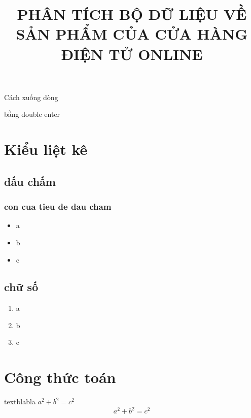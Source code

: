 \documentclass[twoside, final]{hcmut_report}
\title{PHÂN TÍCH BỘ DỮ LIỆU VỀ SẢN PHẨM CỦA CỬA HÀNG ĐIỆN TỬ ONLINE}
\begin{document}
\begin{titlepage}
    \coverpage
\end{titlepage}
\newpage
\setcounter{page}{1}
\pagestyle{empty}
\tableofcontents
\pagestyle{fancy}
\pagebreak
Cách xuống dòng

bằng double enter
\section{Kiểu liệt kê}
\subsection{dấu chấm}
\subsubsection{con cua tieu de dau cham}

\begin{itemize}
    \item a 
    \item b 
    \item c 
\end{itemize}

\subsection{chữ số}
\begin{enumerate}
    \item a 
    \item b 
    \item c
\end{enumerate}

\section{Công thức toán}
textblabla $a^2+b^2=c^2$
$$a^2+b^2=c^2$$

\newpage
\end{document}

